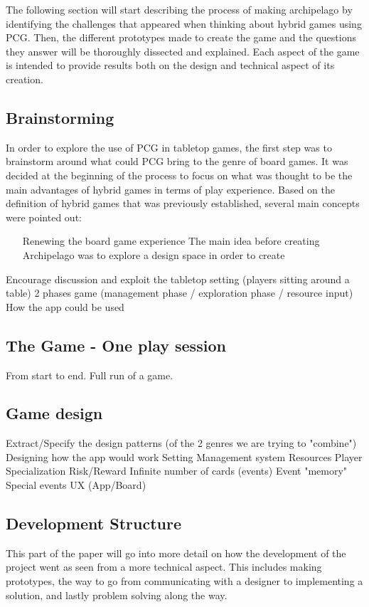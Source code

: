 The following section will start describing the process of making archipelago by identifying the challenges that appeared when thinking about hybrid games using PCG. Then, the different prototypes made to create the game and the questions they answer will be thoroughly dissected and explained. Each aspect of the game is intended to provide results both on the design and technical aspect of its creation. 
\subsection{Brainstorming}

In order to explore the use of PCG in tabletop games, the first step was to brainstorm around what could PCG bring to the genre of board games. It was decided at the beginning of the process to focus on what was thought to be the main advantages of hybrid games in terms of play experience. Based on the definition of hybrid games that was previously established, several main concepts were pointed out:
\begin{itemize}
\item[Renewing the board game experience]
The main idea before creating Archipelago was to explore a design space in order to create 
\end{itemize}


Encourage discussion and exploit the tabletop setting (players sitting around a table)
2 phases game (management phase / exploration phase / resource input)
How the app could be used
\subsection{The Game - One play session}
From start to end. Full run of a game.
\subsection{Game design}
Extract/Specify the design patterns (of the 2 genres we are trying to "combine")
Designing how the app would work
Setting
Management system
Resources
Player Specialization
Risk/Reward
Infinite number of cards (events)
Event "memory"
Special events
UX (App/Board)

\subsection{Development Structure}
This part of the paper will go into more detail on how the development of the project went as seen from a more technical aspect. This includes making prototypes, the way to go from communicating with a designer to implementing a solution, and lastly problem solving along the way.
